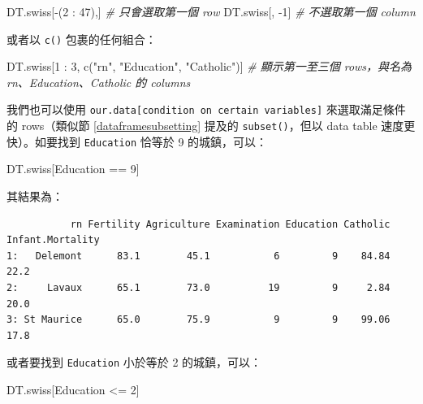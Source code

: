 \documentclass[
]{book}
\newenvironment{Shaded}{\begin{snugshade}}{\end{snugshade}}
\newcommand{\CommentTok}[1]{\textcolor[rgb]{0.56,0.35,0.01}{\textit{#1}}}
\newcommand{\DecValTok}[1]{\textcolor[rgb]{0.00,0.00,0.81}{#1}}
\newcommand{\FunctionTok}[1]{\textcolor[rgb]{0.00,0.00,0.00}{#1}}
\newcommand{\NormalTok}[1]{#1}
\newcommand{\SpecialCharTok}[1]{\textcolor[rgb]{0.00,0.00,0.00}{#1}}
\newcommand{\StringTok}[1]{\textcolor[rgb]{0.31,0.60,0.02}{#1}}
\theoremstyle{definition}
\theoremstyle{remark}
\begin{document}
\begin{Shaded}
\begin{Highlighting}[]
\NormalTok{DT.swiss[}\SpecialCharTok{{-}}\NormalTok{(}\DecValTok{2} \SpecialCharTok{:} \DecValTok{47}\NormalTok{),]  }\CommentTok{\# 只會選取第一個 row}
\NormalTok{DT.swiss[, }\SpecialCharTok{{-}}\DecValTok{1}\NormalTok{]  }\CommentTok{\# 不選取第一個 column}
\end{Highlighting}
\end{Shaded}

或者以 \texttt{c()} 包裹的任何組合：

\begin{Shaded}
\begin{Highlighting}[]
\NormalTok{DT.swiss[}\DecValTok{1} \SpecialCharTok{:} \DecValTok{3}\NormalTok{, }\FunctionTok{c}\NormalTok{(}\StringTok{"rn"}\NormalTok{, }\StringTok{"Education"}\NormalTok{, }\StringTok{"Catholic"}\NormalTok{)]}
\CommentTok{\#  顯示第一至三個 rows，與名為 rn、Education、Catholic 的 columns}
\end{Highlighting}
\end{Shaded}

我們也可以使用 \texttt{our.data{[}condition\ on\ certain\ variables{]}} 來選取滿足條件的 rows（類似節 \ref{dataframesubsetting} 提及的 \texttt{subset()}，但以 data table 速度更快）。如要找到 \texttt{Education} 恰等於 9 的城鎮，可以：

\begin{Shaded}
\begin{Highlighting}[]
\NormalTok{DT.swiss[Education }\SpecialCharTok{==} \DecValTok{9}\NormalTok{]}
\end{Highlighting}
\end{Shaded}

其結果為：

\begin{verbatim}
           rn Fertility Agriculture Examination Education Catholic Infant.Mortality
1:   Delemont      83.1        45.1           6         9    84.84             22.2
2:     Lavaux      65.1        73.0          19         9     2.84             20.0
3: St Maurice      65.0        75.9           9         9    99.06             17.8
\end{verbatim}

或者要找到 \texttt{Education} 小於等於 2 的城鎮，可以：

\begin{Shaded}
\begin{Highlighting}[]
\NormalTok{DT.swiss[Education }\SpecialCharTok{\textless{}=} \DecValTok{2}\NormalTok{]}
\end{Highlighting}
\end{Shaded}
\end{document}
